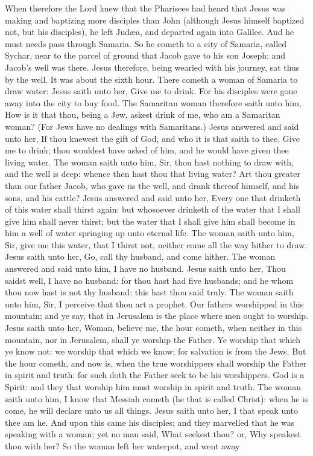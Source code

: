When therefore the Lord knew that the Pharisees had heard that Jesus was making and baptizing more disciples than John (although Jesus himself baptized not, but his disciples), he left Judæa, and departed again into Galilee. And he must needs pass through Samaria. So he cometh to a city of Samaria, called Sychar, near to the parcel of ground that Jacob gave to his son Joseph: and Jacob’s well was there. Jesus therefore, being wearied with his journey, sat thus by the well. It was about the sixth hour. There cometh a woman of Samaria to draw water: Jesus saith unto her, Give me to drink. For his disciples were gone away into the city to buy food. The Samaritan woman therefore saith unto him, How is it that thou, being a Jew, askest drink of me, who am a Samaritan woman? (For Jews have no dealings with Samaritans.) Jesus answered and said unto her, If thou knewest the gift of God, and who it is that saith to thee, Give me to drink; thou wouldest have asked of him, and he would have given thee living water. The woman saith unto him, Sir, thou hast nothing to draw with, and the well is deep: whence then hast thou that living water? Art thou greater than our father Jacob, who gave us the well, and drank thereof himself, and his sons, and his cattle? Jesus answered and said unto her, Every one that drinketh of this water shall thirst again: but whosoever drinketh of the water that I shall give him shall never thirst; but the water that I shall give him shall become in him a well of water springing up unto eternal life. The woman saith unto him, Sir, give me this water, that I thirst not, neither come all the way hither to draw. Jesus saith unto her, Go, call thy husband, and come hither. The woman answered and said unto him, I have no husband. Jesus saith unto her, Thou saidst well, I have no husband: for thou hast had five husbands; and he whom thou now hast is not thy husband: this hast thou said truly. The woman saith unto him, Sir, I perceive that thou art a prophet. Our fathers worshipped in this mountain; and ye say, that in Jerusalem is the place where men ought to worship. Jesus saith unto her, Woman, believe me, the hour cometh, when neither in this mountain, nor in Jerusalem, shall ye worship the Father. Ye worship that which ye know not: we worship that which we know; for salvation is from the Jews. But the hour cometh, and now is, when the true worshippers shall worship the Father in spirit and truth: for such doth the Father seek to be his worshippers. God is a Spirit: and they that worship him must worship in spirit and truth. The woman saith unto him, I know that Messiah cometh (he that is called Christ): when he is come, he will declare unto us all things. Jesus saith unto her, I that speak unto thee am he.  And upon this came his disciples; and they marvelled that he was speaking with a woman; yet no man said, What seekest thou? or, Why speakest thou with her? So the woman left her waterpot, and went away 